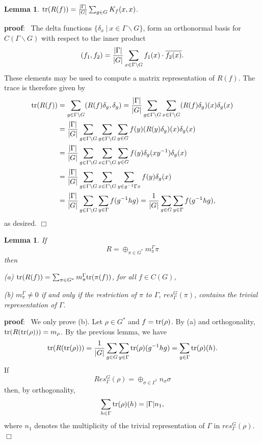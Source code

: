 \documentclass[12pt]{article}
\newtheorem{lemma}[theorem]{Lemma}
\def\pf{{\bf proof}:\ }
\def\qed{$\Box$}
\begin{document}
\begin{lemma} ${\rm tr}(R(f))={|\Gamma |\over |G|}\sum_{g\in G} K_f(x,x)$.
\end{lemma}

\pf
The delta functions $\{\delta_x\ |\ x\in \Gamma \backslash G\}$,
form an orthonormal basis for $C(\Gamma \backslash G)$ with respect to
the inner product
\[
(f_1,f_2)
={|\Gamma |\over |G|}\sum_{x\in \Gamma \backslash G}f_1 (x)\cdot 
\overline{f_2(x)}.
\]
These elements may be used to compute a matrix 
representation of $R(f)$. The trace is therefore given by
\[
\begin{split}
{\rm tr}(R(f))
&=\sum_{g\in \Gamma \backslash G}(R(f)\delta_g,\delta_g)
={|\Gamma |\over |G|}\sum_{g\in \Gamma \backslash G}
\sum_{x\in \Gamma \backslash G}(R(f)\delta_g)(x)\delta_g(x)\\
&={|\Gamma |\over |G|}\sum_{g\in \Gamma \backslash G}
\sum_{g\in \Gamma \backslash G}\sum_{y\in G}
f(y)(R(y)\delta_g)(x)\delta_g(x)\\
&={|\Gamma |\over |G|}\sum_{g\in \Gamma \backslash G}
\sum_{x\in \Gamma \backslash G}\sum_{y\in G}
f(y)\delta_g(xy^{-1})\delta_g(x)\\
&={|\Gamma |\over |G|}\sum_{g\in \Gamma \backslash G}
\sum_{x\in \Gamma \backslash G}\sum_{y\in g^{-1}\Gamma x}
f(y)\delta_g(x)\\
&={|\Gamma |\over |G|}\sum_{g\in \Gamma \backslash G}\sum_{y\in \Gamma }f(g^{-1}hg)
={1\over |G|}\sum_{g\in G}\sum_{y\in \Gamma }f(g^{-1}hg),
\end{split}
\]
as desired.   
\qed

\begin{lemma} If
\[
R=\oplus_{\pi\in G^*}m^\Gamma _\pi \pi
\]
then 

(a) ${\rm tr}(R(f))=\sum_{\pi\in G^*}m^\Gamma _\pi {\rm tr}(\pi(f))$,
for all $f\in C(G)$,

(b) $m^\Gamma _\pi \not= 0$ if and only if the restriction of
$\pi$ to $\Gamma $, $res_\Gamma ^G(\pi)$,
contains the trivial representation of $\Gamma $.
\end{lemma}

\pf
We only prove (b). Let 
$\rho\in G^*$ and $f={\rm tr}(\rho)$.
By (a) and orthogonality, ${\rm tr}(R({\rm tr}(\rho)))=m_\rho$.
By the previous lemma, we have
\[
{\rm tr}(R({\rm tr}(\rho)))
={1\over |G|}\sum_{g\in G}\sum_{y\in \Gamma }{\rm tr}(\rho)(g^{-1}hg)
=\sum_{y\in \Gamma }{\rm tr}(\rho)(h).
\]
If 
\[
Res_\Gamma ^G(\rho)=
\oplus_{\sigma\in \Gamma ^*}n_\sigma \sigma
\]
then, by orthogonality, 
\[
\sum_{h\in \Gamma }{\rm tr}(\rho)(h)=|\Gamma |n_1,
\]
where $n_1$ denotes the multiplicity of the trivial
representation of $\Gamma $ in $res_\Gamma ^G(\rho)$.
\qed
\end{document}
